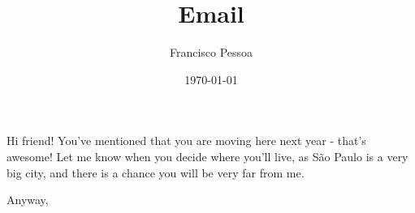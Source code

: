 \documentclass[]{article}
\title{Email}
\date{\today}
\author{Francisco Pessoa}
\begin{document}
\maketitle

Hi friend!
You've mentioned that you are moving here next year - that's awesome! Let me know when you decide where you'll live, as São Paulo is a very big city, and there is a chance you will be very far from me.

Anyway,
\end{document}

